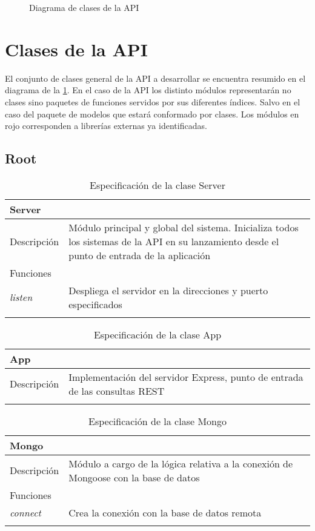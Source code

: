 \begin{figure}[H]
    \centering
    \caption{Diagrama de clases de la API}
    \label{fig:diagrama_clases_api}
\end{figure}

\section{Clases de la API}

El conjunto de clases general de la API a desarrollar se encuentra resumido en el diagrama de la \ref{fig:diagrama_clases_api}. En el caso de la API los distinto módulos representarán no clases sino paquetes de funciones servidos por sus diferentes índices. Salvo en el caso del paquete de modelos que estará conformado por clases. Los módulos en rojo corresponden a librerías externas ya identificadas.

\subsection{Root}

\begin{longtable}{|p{} p{}|}
    \hline
    \multicolumn{2}{|l|}{Server} \\ \hline \hline
    Descripción      & Módulo principal y global del sistema. Inicializa todos los sistemas de la API en su lanzamiento desde el punto de entrada de la aplicación \\ \hline
    \multicolumn{2}{|l|}{Funciones} \\
    \emph{listen}  & Despliega el servidor en la direcciones y puerto especificados  \\ \hline
    \caption{Especificación de la clase Server}
    \label{class:api:server}
\end{longtable}

\begin{longtable}{|p{} p{}|}
    \hline
    \multicolumn{2}{|l|}{App} \\ \hline \hline
    Descripción      & Implementación del servidor Express, punto de entrada de las consultas REST \\ \hline
    \caption{Especificación de la clase App}
    \label{class:api:app}
\end{longtable}

\vspace{-20pt}
\begin{longtable}{|p{} p{}|}
    \hline
    \multicolumn{2}{|l|}{Mongo} \\ \hline \hline
    Descripción      & Módulo a cargo de la lógica relativa a la conexión de Mongoose con la base de datos \\ \hline
    \multicolumn{2}{|l|}{Funciones} \\
    \emph{connect}  & Crea la conexión con la base de datos remota  \\ \hline
    \caption{Especificación de la clase Mongo}
    \label{class:api:mongo}
\end{longtable}

